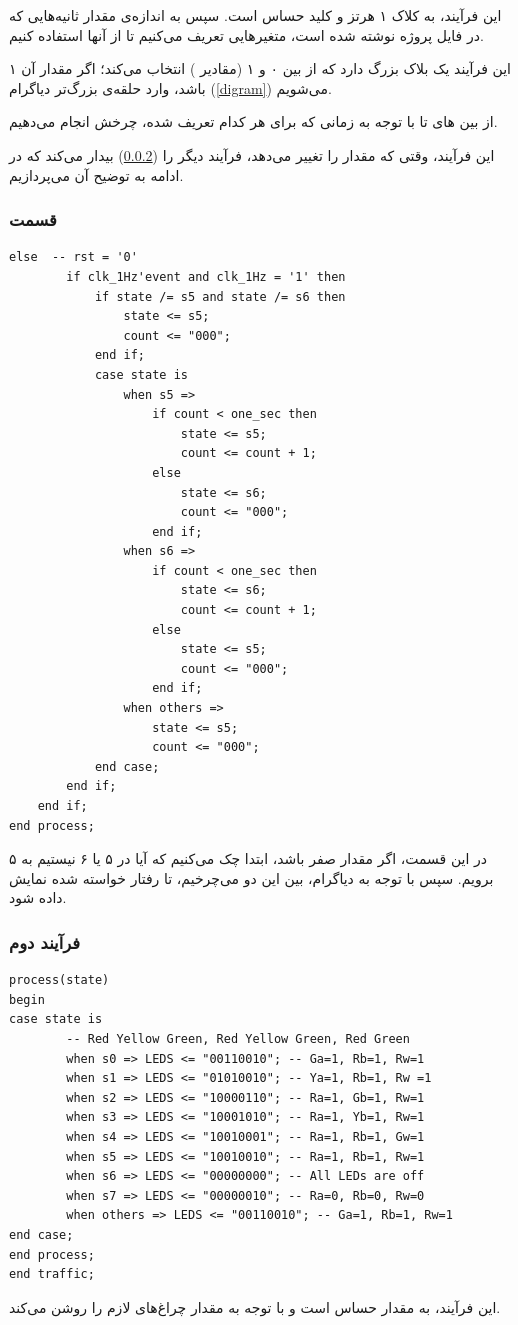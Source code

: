\documentclass[dvipsnames, svgnames, x11names, a4paper, 11pt]{article}
\begin{document}
این فرآیند، به کلاک ۱ هرتز و کلید  حساس است. سپس به اندازه‌ی مقدار ثانیه‌هایی که در فایل پروژه نوشته شده است، متغیر‌هایی تعریف می‌کنیم تا از آنها استفاده کنیم.

این فرآیند یک بلاک  بزرگ دارد که از بین ۰ و ۱ (مقادیر ) انتخاب می‌کند؛ اگر مقدار آن ۱ باشد، وارد حلقه‌ی بزرگ‌‌تر دیاگرام (\ref{digram}) می‌شویم.

از بین 
های
تا
با توجه به زمانی که برای هر کدام تعریف شده، چرخش انجام می‌دهیم.

این فرآیند، وقتی که مقدار 
را تغییر می‌دهد، فرآیند دیگر را (\ref{second-process}) بیدار می‌کند که در ادامه به توضیح آن می‌پردازیم.

\newpage
\subsubsection{قسمت }
\begin{latin}
\begin{lstlisting}[firstnumber=101]
    else  -- rst = '0'
        if clk_1Hz'event and clk_1Hz = '1' then
			if state /= s5 and state /= s6 then
				state <= s5;
				count <= "000";
			end if;
			case state is
				when s5 =>
					if count < one_sec then
						state <= s5;
						count <= count + 1;
					else
						state <= s6;
						count <= "000";
					end if;
				when s6 =>
					if count < one_sec then
						state <= s6;
						count <= count + 1;
					else
						state <= s5;
						count <= "000";
					end if;
				when others =>
					state <= s5;
					count <= "000";
            end case;
        end if;
    end if;
end process;
\end{lstlisting}
\end{latin}

در این قسمت، اگر مقدار  صفر باشد، ابتدا چک می‌کنیم که آیا در 
۵
 یا ۶ نیستیم به 
۵ برویم. سپس با توجه به دیاگرام، بین این دو 
می‌چرخیم، تا رفتار خواسته شده نمایش داده شود.

\newpage
\subsubsection{فرآیند دوم}
\label{second-process}
\begin{latin}
\begin{lstlisting}[firstnumber=131]
process(state)
begin
case state is
		-- Red Yellow Green, Red Yellow Green, Red Green
		when s0 => LEDS <= "00110010"; -- Ga=1, Rb=1, Rw=1
		when s1 => LEDS <= "01010010"; -- Ya=1, Rb=1, Rw =1
		when s2 => LEDS <= "10000110"; -- Ra=1, Gb=1, Rw=1
		when s3 => LEDS <= "10001010"; -- Ra=1, Yb=1, Rw=1
		when s4 => LEDS <= "10010001"; -- Ra=1, Rb=1, Gw=1
		when s5 => LEDS <= "10010010"; -- Ra=1, Rb=1, Rw=1
		when s6 => LEDS <= "00000000"; -- All LEDs are off
        when s7 => LEDS <= "00000010"; -- Ra=0, Rb=0, Rw=0
		when others => LEDS <= "00110010"; -- Ga=1, Rb=1, Rw=1
end case;
end process;
end traffic;
\end{lstlisting}
\end{latin}

این فرآیند، به مقدار 
حساس است و با توجه به مقدار 
چراغ‌های لازم را روشن می‌کند.
\end{document}
